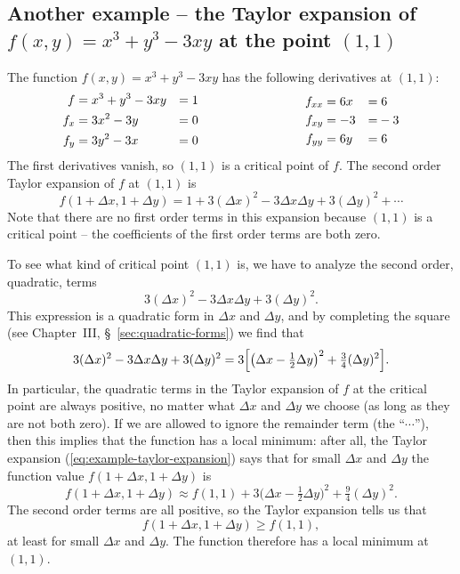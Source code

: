 \subsection{Another example -- the Taylor expansion of $f(x, y) = x^3+y^3-3xy$
  at the point $(1,1)$}
\label{sec:taylor-example-at-minimum}
The function $f(x, y) = x^3+y^3-3xy$ has the
following derivatives at $(1,1)$:
\[
\begin{aligned}
  f & =  x^3+y^3-3xy &= 1 \\
  f_x&= 3x^2 - 3y &= 0 \\
  f_y&= 3y^2-3x &= 0
\end{aligned}\hspace{0.25\textwidth}
\begin{aligned}
  f_{xx} &= 6x &=&\;6 \\ f_{xy} &=-3 &=&-3 \\ f_{yy} &= 6y &=&\;6
\end{aligned}
\]
The first derivatives vanish, so $(1,1)$ is a critical point of $f$.
The second order Taylor expansion of $f$ at $(1,1)$ is
\begin{equation}\label{eq:example-taylor-expansion}
  f(1+\Delta x, 1+\Delta y)
  = 1 + 3(\Delta x)^2 - 3\Delta x \Delta y + 3(\Delta y)^2 +\cdots
\end{equation}
Note that there are no first order terms in this expansion because $(1,1)$ is a critical point -- the coefficients of the first order terms are both zero.

To see what kind of critical point $(1,1)$ is, we have to analyze the second
order, quadratic, terms
\begin{equation}
  3(\Delta x)^2 - 3\Delta x \Delta y + 3(\Delta y)^2.
  \label{eq:example-quadratic-form}
\end{equation}
This expression is a quadratic form in $\Delta x$ and $\Delta y$, and by
completing the square (see Chapter~III, \S~\ref{sec:quadratic-forms}) we
find that
\[
3(\Delta x)^2 - 3\Delta x \Delta y + 3(\Delta y)^2
=3 \Bigl[\bigl(\Delta x - \tfrac 12 \Delta y\bigr)^2
  + \tfrac 34 (\Delta y)^2\Bigr].
\]
In particular, the quadratic terms in the Taylor expansion of $f$ at the
critical point are always positive, no matter what $\Delta x$ and $\Delta
y$ we choose (as long as they are not both zero).  If we are allowed to
ignore the remainder term (the ``$\cdots$''), then this implies that the
function has a local minimum: after all, the Taylor expansion
(\ref{eq:example-taylor-expansion}) says that for small $\Delta x$ and
$\Delta y$ the function value $f(1+\Delta x, 1+\Delta y)$ is 
\[
f(1+\Delta x, 1+\Delta y) \approx 
f(1, 1) + 3 \bigl(\Delta x - \tfrac 12 \Delta y\bigr)^2
  + \tfrac 94 (\Delta y)^2. 
\]
The second order terms are all positive, so the Taylor expansion tells us that
\[
f(1+\Delta x, 1+\Delta y) \geq f(1,1),
\]
at least for small $\Delta x$ and $\Delta y$.  The function therefore has a local minimum at $(1,1)$.

